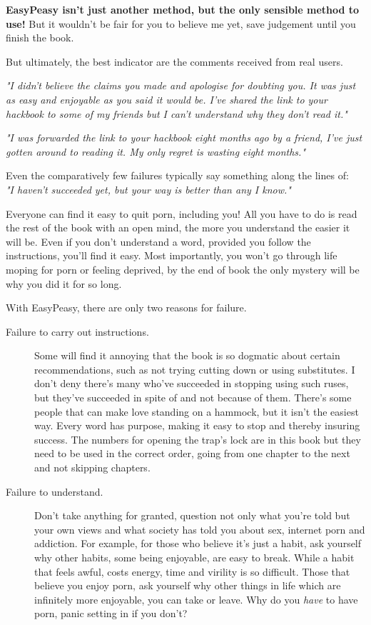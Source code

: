 \documentclass[easypeasy.tex]{subfiles}
\begin{document}
\textbf{EasyPeasy isn't just another method, but the only sensible method to use!} But it wouldn't be fair for you to believe me yet, save judgement until you finish the book.

But ultimately, the best indicator are the comments received from real users.

\textit{"I didn't believe the claims you made and apologise for doubting you. It was just as easy and enjoyable as you said it would be. I've shared the link to your hackbook to some of my friends but I can't understand why they don't read it."}

\textit{"I was forwarded the link to your hackbook eight months ago by a friend, I've just gotten around to reading it. My only regret is wasting eight months."}

Even the comparatively few failures typically say something along the lines of: \\ \textit{"I haven't succeeded yet, but your way is better than any I know."}

Everyone can find it easy to quit porn, including you! All you have to do is read the rest of the book with an open mind, the more you understand the easier it will be. Even if you don't understand a word, provided you follow the instructions, you'll find it easy. Most importantly, you won't go through life moping for porn or feeling deprived, by the end of book the only mystery will be why you did it for so long.

With EasyPeasy, there are only two reasons for failure.

\begin{description}
  \item [Failure to carry out instructions.] Some will find it annoying that the book is so dogmatic about certain recommendations, such as not trying cutting down or using substitutes. I don't deny there's many who've succeeded in stopping using such ruses, but they've succeeded in spite of and not because of them. There's some people that can make love standing on a hammock, but it isn't the easiest way. Every word has purpose, making it easy to stop and thereby insuring success. The numbers for opening the trap's lock are in this book but they need to be used in the correct order, going from one chapter to the next and not skipping chapters.

  \item [Failure to understand.] Don't take anything for granted, question not only what you're told but your own views and what society has told you about sex, internet porn and addiction. For example, for those who believe it's just a habit, ask yourself why other habits, some being enjoyable, are easy to break. While a habit that feels awful, costs energy, time and virility is so difficult. Those that believe you enjoy porn, ask yourself why other things in life which are infinitely more enjoyable, you can take or leave. Why do you \textit{have} to have porn, panic setting in if you don't?
\end{description}
\end{document}
